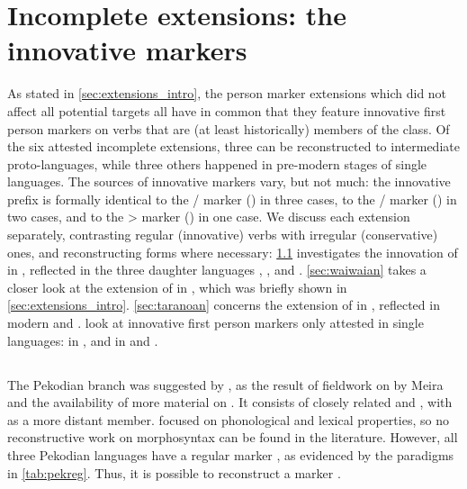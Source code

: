 \section{Incomplete extensions: the innovative \texorpdfstring{}{Sa} markers}
\label{sec:extensions}
As stated in \cref{sec:extensions_intro}, the person marker extensions which did not affect all potential targets all have in common that they feature innovative first person markers on verbs that are (at least historically) members of the  class.
Of the six attested incomplete extensions, three can be reconstructed to intermediate proto-languages, while three others happened in pre-modern stages of single languages.
The sources of innovative markers vary, but not much: the innovative  prefix is formally identical to the / marker (\PC {}) in three cases, to the / marker (\PC {}) in two cases, and to the > marker (\PC {}) in one case.
We discuss each extension separately, contrasting regular (innovative) verbs with irregular (conservative) ones, and reconstructing forms where necessary:
\cref{sec:pekodian} investigates the innovation of  in \PPek, reflected in the three daughter languages \arara, \ikpeng, and \bakairi.
\cref{sec:waiwaian} takes a closer look at the extension of  in \PWai, which was briefly shown in \cref{sec:extensions_intro}.
\cref{sec:taranoan} concerns the extension of  in \PTir, reflected in modern \trio and \akuriyo.
 look at innovative first person markers only attested in single languages:
 in \akuriyo, and  in \carijo and \yukpa.
 
\subsection{\PPek {}}
\label{sec:pekodian}
The Pekodian branch was suggested by \textcite{meira2005southern}, as the result of fieldwork on \bakairi by Meira and the availability of more material on \ikpeng. %
It consists of closely related \arara and \ikpeng, with \bakairi as a more distant member.
\textcite{meira2005southern} focused on phonological and lexical properties, so no reconstructive work on \PPek morphosyntax can be found in the literature.
However, all three Pekodian languages have a regular  marker , as evidenced by the paradigms in \cref{tab:pekreg}.
Thus, it is possible to reconstruct a \PPek {} marker .

